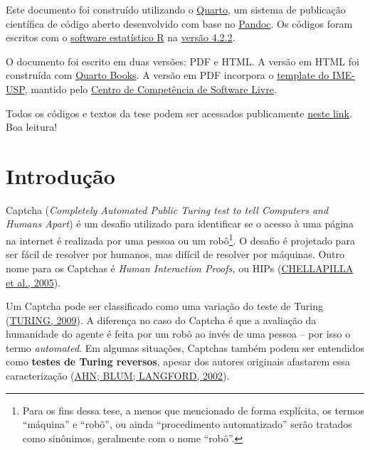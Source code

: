 \documentclass[12pt,twoside,brazilian]{book}
\begin{document}

Este documento foi construído utilizando o
\href{https://quarto.org/}{Quarto}, um sistema de publicação científica
de código aberto desenvolvido com base no
\href{https://pandoc.org/}{Pandoc}. Os códigos foram escritos com o
\href{https://cran.r-project.org/}{software estatístico R} na
\href{https://cran.r-project.org/bin/windows/base/}{versão 4.2.2}.

O documento foi escrito em duas versões: PDF e HTML. A versão em HTML
foi construída com \href{https://quarto.org/docs/books/}{Quarto Books}.
A versão em PDF incorpora o
\href{https://gitlab.com/ccsl-usp/modelo-latex}{template do IME-USP},
mantido pelo \href{https://ccsl.ime.usp.br/}{Centro de Competência de
Software Livre}.

Todos os códigos e textos da tese podem ser acessados publicamente
\href{https://github.com/jtrecenti/doutorado}{neste link}. Boa leitura!


\hypertarget{sec-introducao}{%
\chapter{Introdução}\label{sec-introducao}}


Captcha (\emph{Completely Automated Public Turing test to tell Computers
and Humans Apart}) é um desafio utilizado para identificar se o acesso à
uma página na internet é realizada por uma pessoa ou um robô\footnote{Para
  os fins dessa tese, a menos que mencionado de forma explícita, os
  termos ``máquina'' e ``robô'', ou ainda ``procedimento automatizado''
  serão tratados como sinônimos, geralmente com o nome ``robô''.}. O
desafio é projetado para ser fácil de resolver por humanos, mas difícil
de resolver por máquinas. Outro nome para os Captchas é \emph{Human
Interaction Proofs,} ou HIPs
(\protect\hyperlink{ref-chellapilla2005}{CHELLAPILLA et al., 2005}).

Um Captcha pode ser classificado como uma variação do teste de Turing
(\protect\hyperlink{ref-turing2009}{TURING, 2009}). A diferença no caso
do Captcha é que a avaliação da humanidade do agente é feita por um robô
ao invés de uma pessoa -- por isso o termo \emph{automated}. Em algumas
situações, Captchas também podem ser entendidos como \textbf{testes de
Turing reversos}, apesar dos autores originais afastarem essa
caracterização
(\protect\hyperlink{ref-vonahnTellingHumansComputers2002}{AHN; BLUM;
LANGFORD, 2002}).
\end{document}

